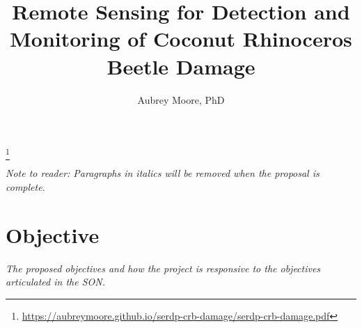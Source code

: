 \documentclass[11pt,letterpaper,english,bibliography=totocnumbered, abstract=on]{scrartcl}
\begin{document}
\titlehead{DRAFT PROPOSAL}

\title{Remote Sensing for Detection and Monitoring of Coconut Rhinoceros Beetle Damage}

\author{Aubrey Moore, PhD}

\maketitle

\footnote{\url{https://aubreymoore.github.io/serdp-crb-damage/serdp-crb-damage.pdf}}


\pagebreak


\textit{Note to reader: Paragraphs in italics will be removed when the proposal is complete.}

\section{Objective}

\textit{The proposed objectives and how the project is responsive to the objectives
articulated in the SON.}\\
\end{document}
